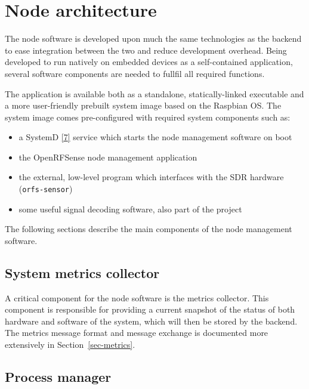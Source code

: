 \documentclass[
  letterpaper,
  a4paper,
  12pt,
  titlepage,
  oneside,
  openany]{book}
\providecommand{\tightlist}{%
  \setlength{\itemsep}{0pt}\setlength{\parskip}{0pt}}\usepackage{longtable,booktabs,array}
\begin{document}
\hypertarget{node-architecture}{%
\section{Node architecture}\label{node-architecture}}

The node software is developed upon much the same technologies as the
backend to ease integration between the two and reduce development
overhead. Being developed to run natively on embedded devices as a
self-contained application, several software components are needed to
fullfil all required functions.

The application is available both as a standalone, statically-linked
executable and a more user-friendly prebuilt system image based on the
Raspbian OS. The system image comes pre-configured with required system
components such as:

\begin{itemize}
\tightlist
\item
  a SystemD \protect\hyperlink{ref-Systemd}{{[}7{]}} service which
  starts the node management software on boot
\item
  the OpenRFSense node management application
\item
  the external, low-level program which interfaces with the SDR hardware
  (\texttt{orfs-sensor})
\item
  some useful signal decoding software, also part of the project
\end{itemize}

The following sections describe the main components of the node
management software.

\hypertarget{system-metrics-collector}{%
\subsection{System metrics collector}\label{system-metrics-collector}}

A critical component for the node software is the metrics collector.
This component is responsible for providing a current snapshot of the
status of both hardware and software of the system, which will then be
stored by the backend. The metrics message format and message exchange
is documented more extensively in Section~\ref{sec-metrics}.

\hypertarget{process-manager}{%
\subsection{Process manager}\label{process-manager}}
\end{document}
